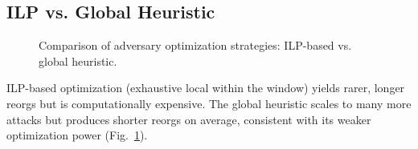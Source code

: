 \subsection{ILP vs. Global Heuristic}
\begin{figure}[htbp!]
\caption{Comparison of adversary optimization strategies: ILP-based vs. global heuristic.}
\label{fig:optimization}
\end{figure}

ILP-based optimization (exhaustive local within the window) yields rarer, longer reorgs but is computationally expensive. The global heuristic scales to many more attacks but produces shorter reorgs on average, consistent with its weaker optimization power (Fig.~\ref{fig:optimization}).


